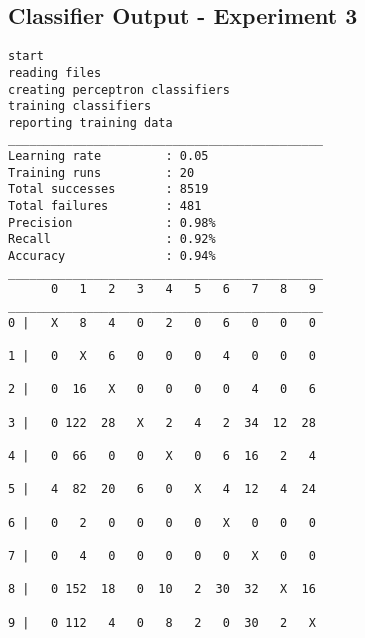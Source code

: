 \documentclass[titlepage,11pt]{article}
\begin{document}
\subsection{Classifier Output - Experiment 3} {
\begin{verbatim}
start
reading files
creating perceptron classifiers
training classifiers
reporting training data
____________________________________________
Learning rate         : 0.05
Training runs         : 20
Total successes       : 8519
Total failures        : 481
Precision             : 0.98%
Recall                : 0.92%
Accuracy              : 0.94%
____________________________________________
      0   1   2   3   4   5   6   7   8   9
____________________________________________
0 |   X   8   4   0   2   0   6   0   0   0

1 |   0   X   6   0   0   0   4   0   0   0

2 |   0  16   X   0   0   0   0   4   0   6

3 |   0 122  28   X   2   4   2  34  12  28

4 |   0  66   0   0   X   0   6  16   2   4

5 |   4  82  20   6   0   X   4  12   4  24

6 |   0   2   0   0   0   0   X   0   0   0

7 |   0   4   0   0   0   0   0   X   0   0

8 |   0 152  18   0  10   2  30  32   X  16

9 |   0 112   4   0   8   2   0  30   2   X


\end{verbatim}}
\end{document}

